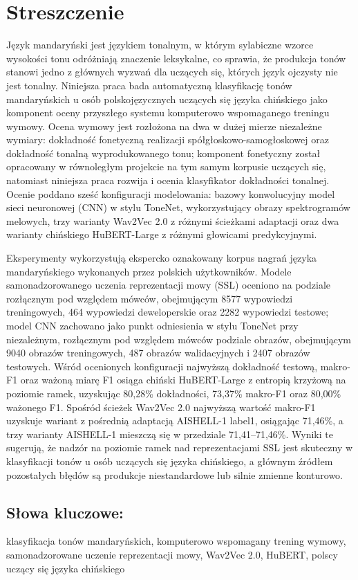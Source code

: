 \chapter*{Streszczenie}

Język mandaryński jest językiem tonalnym, w którym sylabiczne wzorce wysokości tonu odróżniają znaczenie leksykalne, co sprawia, że produkcja tonów stanowi jedno z głównych wyzwań dla uczących się, których język ojczysty nie jest tonalny. Niniejsza praca bada automatyczną klasyfikację tonów mandaryńskich u osób polskojęzycznych uczących się języka chińskiego jako komponent oceny przyszłego systemu komputerowo wspomaganego treningu wymowy. Ocena wymowy jest rozłożona na dwa w dużej mierze niezależne wymiary: dokładność fonetyczną realizacji spółgłoskowo-samogłoskowej oraz dokładność tonalną wyprodukowanego tonu; komponent fonetyczny został opracowany w równoległym projekcie na tym samym korpusie uczących się, natomiast niniejsza praca rozwija i ocenia klasyfikator dokładności tonalnej. Ocenie poddano sześć konfiguracji modelowania: bazowy konwolucyjny model sieci neuronowej (CNN) w stylu ToneNet, wykorzystujący obrazy spektrogramów melowych, trzy warianty Wav2Vec 2.0 z różnymi ścieżkami adaptacji oraz dwa warianty chińskiego HuBERT-Large z różnymi głowicami predykcyjnymi.

Eksperymenty wykorzystują ekspercko oznakowany korpus nagrań języka mandaryńskiego wykonanych przez polskich użytkowników. Modele samonadzorowanego uczenia reprezentacji mowy (SSL) oceniono na podziale rozłącznym pod względem mówców, obejmującym 8577 wypowiedzi treningowych, 464 wypowiedzi deweloperskie oraz 2282 wypowiedzi testowe; model CNN zachowano jako punkt odniesienia w stylu ToneNet przy niezależnym, rozłącznym pod względem mówców podziale obrazów, obejmującym 9040 obrazów treningowych, 487 obrazów walidacyjnych i 2407 obrazów testowych. Wśród ocenionych konfiguracji najwyższą dokładność testową, makro-F1 oraz ważoną miarę F1 osiąga chiński HuBERT-Large z entropią krzyżową na poziomie ramek, uzyskując 80,28\% dokładności, 73,37\% makro-F1 oraz 80,00\% ważonego F1. Spośród ścieżek Wav2Vec 2.0 najwyższą wartość makro-F1 uzyskuje wariant z pośrednią adaptacją AISHELL-1 label1, osiągając 71,46\%, a trzy warianty AISHELL-1 mieszczą się w przedziale 71,41--71,46\%. Wyniki te sugerują, że nadzór na poziomie ramek nad reprezentacjami SSL jest skuteczny w klasyfikacji tonów u osób uczących się języka chińskiego, a głównym źródłem pozostałych błędów są produkcje niestandardowe lub silnie zmienne konturowo.

\section*{S{\l}owa kluczowe:}
\noindent klasyfikacja tonów mandaryńskich, komputerowo wspomagany trening wymowy, samonadzorowane uczenie reprezentacji mowy, Wav2Vec 2.0, HuBERT, polscy uczący się języka chińskiego
